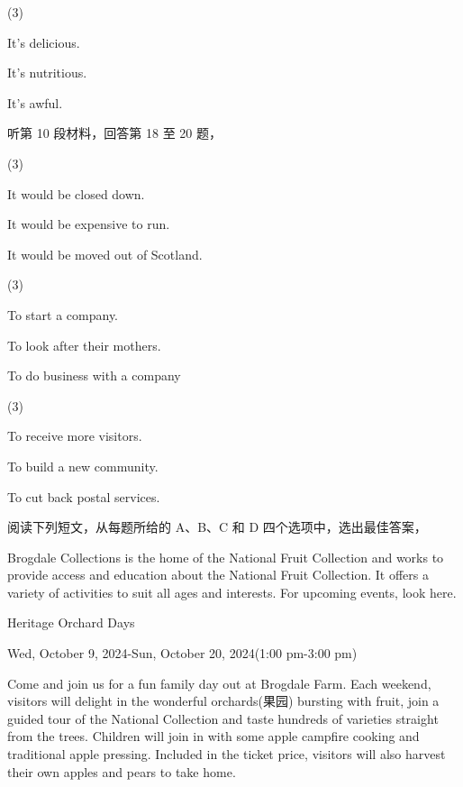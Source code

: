 \documentclass{英语试卷}
\begin{document}
\begin{choices}(3)
  \item It's delicious.
  \item It's nutritious.
  \item It's awful.
\end{choices}
\par 听第 10 段材料，回答第 18 至 20 题，\par
{}
\begin{choices}(3)
  \item It would be closed down.
  \item It would be expensive to run.
  \item It would be moved out of Scotland.
\end{choices}
\begin{choices}(3)
  \item To start a company.
  \item To look after their mothers.
  \item To do business with a company
\end{choices}
\begin{choices}(3)
  \item To receive more visitors.
  \item To build a new community.
  \item To cut back postal services.
\end{choices}
\par 阅读下列短文，从每题所给的 A、B、C 和 D 四个选项中，选出最佳答案，\par
{}
\par Brogdale Collections is the home of the National Fruit Collection and works to provide access and education about the National Fruit Collection. It offers a variety of activities to suit all ages and interests. For upcoming events, look here.\par
\par Heritage Orchard Days\par
\par Wed, October 9, 2024-Sun, October 20, 2024(1:00 pm-3:00 pm)\par
\par Come and join us for a fun family day out at Brogdale Farm. Each weekend, visitors will delight in the wonderful orchards(果园) bursting with fruit, join a guided tour of the National Collection and taste hundreds of varieties straight from the trees. Children will join in with some apple campfire cooking and traditional apple pressing. Included in the ticket price, visitors will also harvest their own apples and pears to take home.\par
\end{document}
